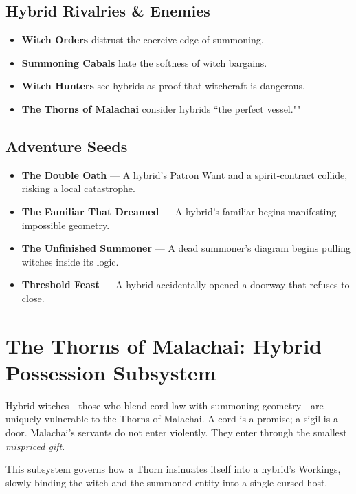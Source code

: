 \documentclass[11pt]{book}
\begin{document}
\subsection*{Hybrid Rivalries \& Enemies}
\begin{itemize}[leftmargin=1.5em]
    \item \textbf{Witch Orders} distrust the coercive edge of summoning.
    \item \textbf{Summoning Cabals} hate the softness of witch bargains.
    \item \textbf{Witch Hunters} see hybrids as proof that witchcraft is dangerous.
    \item \textbf{The Thorns of Malachai} consider hybrids ``the perfect vessel.""
\end{itemize}

\subsection*{Adventure Seeds}
\begin{itemize}[leftmargin=1.5em]
    \item \textbf{The Double Oath} --- A hybrid's Patron Want and a spirit-contract collide, risking a local catastrophe.
    \item \textbf{The Familiar That Dreamed} --- A hybrid's familiar begins manifesting impossible geometry.
    \item \textbf{The Unfinished Summoner} --- A dead summoner's diagram begins pulling witches inside its logic.
    \item \textbf{Threshold Feast} --- A hybrid accidentally opened a doorway that refuses to close.
\end{itemize}

\section*{The Thorns of Malachai: Hybrid Possession Subsystem}
\label{malachai:hybridpossession}

Hybrid witches---those who blend cord-law with summoning geometry---are uniquely
vulnerable to the Thorns of Malachai. A cord is a promise; a sigil is a door.
Malachai's servants do not enter violently. They enter through the smallest
\emph{mispriced gift}.

This subsystem governs how a Thorn insinuates itself into a hybrid's Workings,
slowly binding the witch and the summoned entity into a single cursed host.
\end{document}

